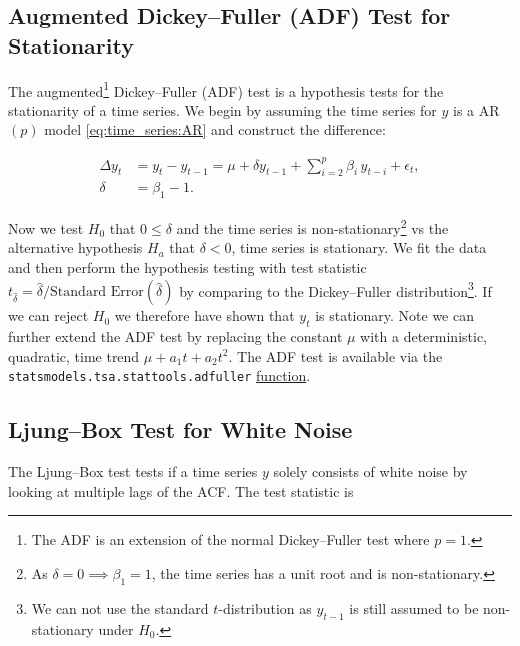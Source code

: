 \subsection{Augmented Dickey--Fuller (ADF) Test for Stationarity}
\label{additional:time_series:ADF}

The augmented\footnote{The ADF is an extension of the normal Dickey--Fuller test where $p = 1$.} Dickey--Fuller (ADF) test
is a hypothesis tests for the stationarity of a time series.
We begin by assuming the time series for $y$ is a AR$\left(p\right)$ model \cref{eq:time_series:AR}
and construct the difference:

\begin{subequations}\label{eq:time_series:ADF}
\begin{align}
\Delta y_{t} &= y_{t} - y_{t-1} = \mu + \delta y_{t-1} + \sum_{i=2}^{p} \beta_{i}\, y_{t-i} + \epsilon_{t}, \label{eq:time_series:ADF:Delta_y} \\
\delta &= \beta_{1} - 1. \label{eq:time_series:ADF:delta}
\end{align}
\end{subequations}

Now we test $H_{0}$ that $0 \leq \delta$ and the time series is
non-stationary\footnote{As $\delta = 0 \implies \beta_{1} = 1$, \ie the time series has a unit root and is non-stationary.}
vs the alternative hypothesis $H_{a}$ that $\delta < 0$, \ie time series is stationary.
We fit the data and then perform the hypothesis testing with test statistic
$t_{\hat{\delta}} = \hat{\delta} / \text{Standard Error}\left(\hat{\delta}\right)$
by comparing to the Dickey--Fuller distribution\footnote{We can not use the standard $t$-distribution as $y_{t-1}$ is still assumed to be non-stationary under $H_{0}$.}.
If we can reject $H_{0}$ we therefore have shown that $y_{t}$ is stationary.
Note we can further extend the ADF test by replacing the constant $\mu$
with a deterministic, quadratic, time trend $\mu + a_{1} t + a_{2} t^{2}$.
The ADF test is available via the \texttt{statsmodels.tsa.stattools.adfuller}
\href{https://www.statsmodels.org/dev/generated/statsmodels.tsa.stattools.adfuller.html}{function}.

\subsection{Ljung--Box Test for White Noise}
\label{additional:time_series:ljung_box}

The Ljung--Box test tests if a time series $y$ solely consists of white noise
by looking at multiple lags of the ACF.
The test statistic is

